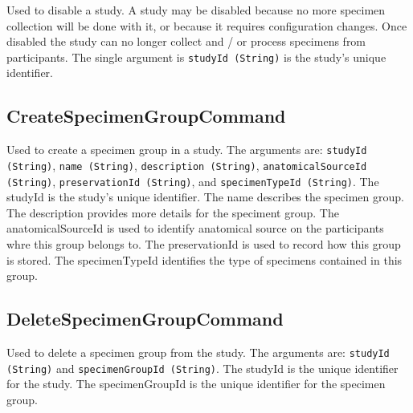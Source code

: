 Used to disable a study. A study may be disabled because no more specimen
collection will be done with it, or because it requires configuration
changes. Once disabled the study can no longer collect and / or process
specimens from participants. The single argument is \texttt{studyId (String)}
is the study's unique identifier.

\subsection*{CreateSpecimenGroupCommand}

Used to create a specimen group in a study. The arguments are: \texttt{studyId
  (String)}, \texttt{name (String)}, \texttt{description (String)},
\texttt{anatomicalSourceId (String)}, \texttt{preservationId (String)}, and
\texttt{specimenTypeId (String)}. The studyId is the study's unique
identifier. The name describes the specimen group. The description provides
more details for the speciment group.  The anatomicalSourceId is used to
identify anatomical source on the participants whre this group belongs to.  The
preservationId is used to record how this group is stored.  The specimenTypeId
identifies the type of specimens contained in this group.

\subsection*{DeleteSpecimenGroupCommand}

Used to delete a specimen group from the study. The arguments are:
\texttt{studyId (String)} and \texttt{specimenGroupId (String)}. The studyId is
the unique identifier for the study. The specimenGroupId is the unique
identifier for the specimen group.

